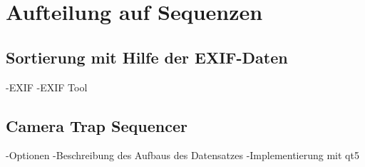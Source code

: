 \newpage
\section{Aufteilung auf Sequenzen}

\subsection{Sortierung mit Hilfe der EXIF-Daten}
-EXIF
-EXIF Tool

\subsection{Camera Trap Sequencer}
-Optionen
-Beschreibung des Aufbaus des Datensatzes
-Implementierung mit qt5
